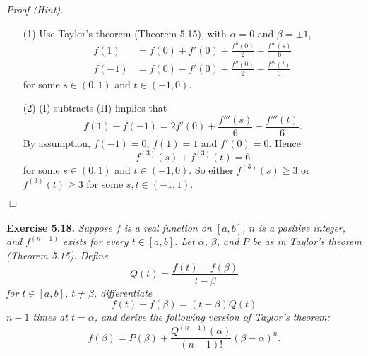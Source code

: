 \documentclass{article}
\begin{document}
\emph{Proof (Hint).}
\begin{enumerate}
\item[(1)]
Use Taylor's theorem (Theorem 5.15), with $\alpha = 0$ and $\beta=\pm 1$,
\begin{align*}
  f(1) &= f(0) + f'(0) + \frac{f''(0)}{2} + \frac{f'''(s)}{6} \tag{I} \\
  f(-1) &= f(0) - f'(0) + \frac{f''(0)}{2} - \frac{f'''(t)}{6} \tag{II}
\end{align*}
for some $s \in (0,1)$ and $t \in (-1,0)$.

\item[(2)]
(I) subtracts (II) implies that
\[
  f(1) - f(-1) = 2 f'(0) + \frac{f'''(s)}{6} + \frac{f'''(t)}{6}.
\]
By assumption, $f(-1)=0$, $f(1)=1$ and $f'(0)=0$.
Hence
\[
  f^{(3)}(s) + f^{(3)}(t) = 6
\]
for some $s \in (0,1)$ and $t \in (-1,0)$.
So either $f^{(3)}(s) \geq 3$ or $f^{(3)}(t) \geq 3$
for some $s, t \in (-1,1)$.
\end{enumerate}
$\Box$ \\\\






\textbf{Exercise 5.18.}
\emph{Suppose $f$ is a real function on $[a,b]$, $n$ is a positive integer,
and $f^{(n-1)}$ exists for every $t \in [a,b]$.
Let $\alpha$, $\beta$, and $P$ be as in Taylor's theorem (Theorem 5.15).
Define
\[
  Q(t) = \frac{f(t) - f(\beta)}{t - \beta}
\]
for $t \in [a,b]$, $t \neq \beta$, differentiate
\[
  f(t) - f(\beta) = (t - \beta)Q(t)
\]
$n-1$ times at $t = \alpha$,
and derive the following version of Taylor's theorem:
\[
  f(\beta) = P(\beta)
    + \frac{Q^{(n-1)}(\alpha)}{(n-1)!} (\beta - \alpha)^n.
\]}
\end{document}
